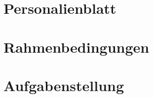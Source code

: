 \documentclass[
11pt, %
a4paper, %
BCOR25mm, %
DIV14, %
footsepline = false, %
headsepline, %
twoside, %
openright,
abstracton, %
listof=totocnumbered, %
bibliography=totocnumbered %
]{scrreprt}
\begin{document}
   
  
  \cleardoublepage
  
  
  \appendix
  
  
  
  \chapter{Personalienblatt}\label{chapter:Personalienblatt}

  
  
  \cleardoublepage
      
  
  \chapter{Rahmenbedingungen}\label{chapter:Rahmenbedingungen}
  
  
  
  \cleardoublepage
  
  
  \chapter{Aufgabenstellung}\label{chapter:Aufgabenstellung}
  
  
\end{document}
